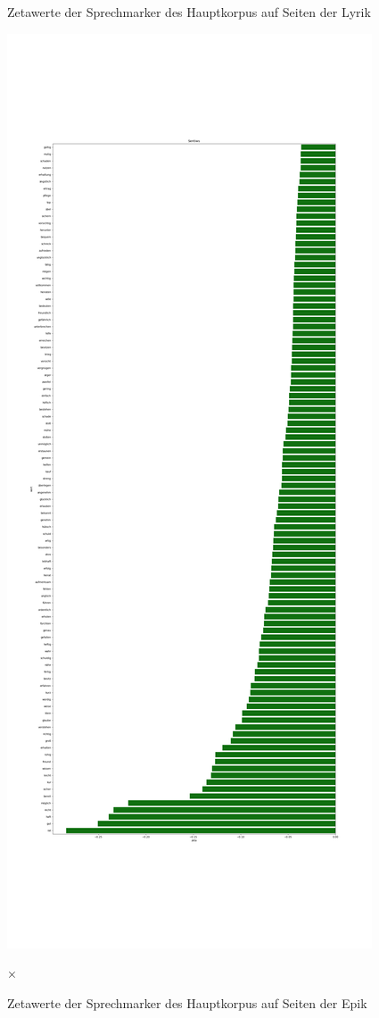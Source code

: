 \documentclass[a4paper,10p]{article}
\begin{document}
\begin{figure}{}
\begin{minipage}[b]{.45\linewidth}
        \caption{Zetawerte der Sprechmarker des Hauptkorpus auf Seiten der Lyrik}
        \label{haupt_sprechmarker}
    \end{minipage}
    \hfill
    \begin{minipage}[b]{.45\linewidth}
        \centering
        \includegraphics[width=\linewidth]{haupt_sentiws_pro_wort2.png}
        \caption{Zetawerte der Sprechmarker des Hauptkorpus auf Seiten der Epik}  
        \label{haupt_sprechmarker2}×
    \end{minipage}
\end{figure}
\end{document}
